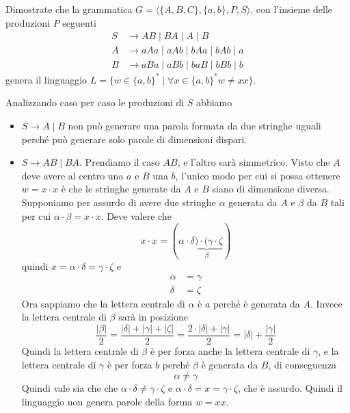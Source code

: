 \documentclass[12pt, answers]{exam}
\newcommand{\grammar}[4]{\langle #1, #2, #3, #4 \rangle}
\newcommand{\prd}{\rightarrow}
\begin{document}
\begin{questions}
	\question Dimostrate che la grammatica $G = \grammar{\{ A, B, C\}}{\{a , b\}}{P}{S}$, con l'insieme delle produzioni $P$ seguenti
	\begin{align*}
		S &\prd A B \mid B A \mid A \mid B \\
		A &\prd a A a \mid a A b \mid b A a \mid b A b \mid a \\
		B &\prd a B a \mid a B b \mid b a B \mid b B b \mid b
	\end{align*}
	genera il linguaggio $L = \{ w \in \{ a , b\}^* \mid \forall x \in \{ a , b \}^* w \neq x x \}$.
	\begin{solution}
		Analizzando caso per caso le produzioni di $S$ abbiamo
		\begin{itemize}
			\item $S \prd A \mid B$ non può generare una parola formata da due stringhe uguali perché può generare solo parole di dimensioni dispari.
			\item $S \prd A B \mid B A$.
				Prendiamo il caso $A B$, e l'altro sarà simmetrico.
				Visto che $A$ deve avere al centro una $a$ e $B$ una $b$, l'unico modo per cui si possa ottenere $w = x \cdot x$ è che le stringhe generate da $A$ e $B$ siano di dimensione diversa.
				Supponiamo per assurdo di avere due stringhe $\alpha$ generata da $A$ e $\beta$ da $B$ tali per cui $\alpha \cdot \beta = x \cdot x$.
				Deve valere che
				$$ x \cdot x = (\alpha \cdot \underbrace{\delta) \cdot (\gamma \cdot \zeta}_{\beta}) $$
				quindi $x = \alpha \cdot \delta = \gamma \cdot \zeta $ e
				\begin{align*}
					\alpha &= \gamma \\
					\delta &= \zeta
				\end{align*}
				Ora sappiamo che la lettera centrale di $\alpha$ è $a$ perché è generata da $A$.
				Invece la lettera centrale di $\beta$ sarà in posizione
				$$ \frac{|\beta|}{2} = \frac{|\delta| + |\gamma| + |\zeta|}{2} = \frac{2 \cdot |\delta| + |\gamma|}{2} = |\delta| + \frac{|\gamma|}{2} $$
				Quindi la lettera centrale di $\beta$ è per forza anche la lettera centrale di $\gamma$, e la lettera centrale di $\gamma$ è per forza $b$ perché $\beta$ è generata da $B$, di conseguenza
				$$ \alpha \neq \gamma $$
				Quindi vale sia che che $\alpha \cdot \delta \neq \gamma \cdot \zeta$ e $ \alpha \cdot \delta = x = \gamma \cdot \zeta$, che è assurdo.
				Quindi il linguaggio non genera parole della forma $w = x x$.
		\end{itemize}
	\end{solution}


\end{questions}
\end{document}
